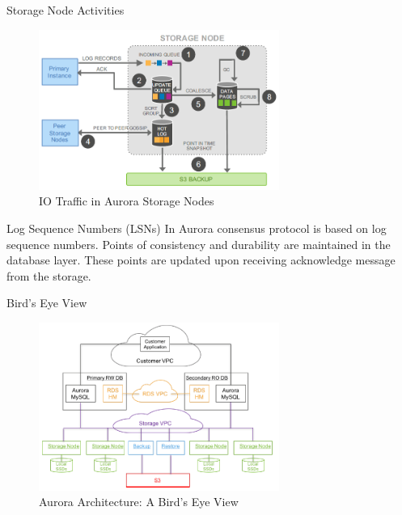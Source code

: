     \begin{frame}{Storage Node Activities}
      \LARGE
      \begin{figure}[t]
        \includegraphics[width=0.7\textwidth]{../images/storage_node.png}
        \caption{IO Traffic in Aurora Storage Nodes}
        \centering
      \end{figure}
    \end{frame}

    \begin{frame}{Log Sequence Numbers (LSNs)}
      \LARGE
      In Aurora consensus protocol is based on log sequence numbers. Points of consistency and durability are maintained in the database layer. These points are updated upon receiving acknowledge message from the storage.
    \end{frame}

    \begin{frame}{Bird's Eye View}
      \LARGE
      \begin{figure}[t]
        \includegraphics[width=0.7\textwidth]{../images/birds_eye.png}
        \caption{Aurora Architecture: A Bird's Eye View}
        \centering
      \end{figure}
    \end{frame}

